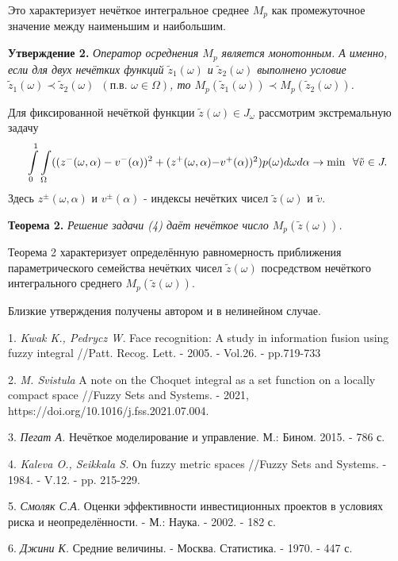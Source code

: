 Это характеризует нечёткое интегральное среднее $M_p$ как промежуточное значение между наименьшим и наибольшим.

\textbf{Утверждение  2.} \textit{Оператор осреднения $M_p$ является монотонным. А именно, если для двух нечётких функций $\tilde{z}_1(\omega)$ и  $\tilde{z}_2(\omega)$ выполнено условие  $\tilde{z}_1(\omega)\prec\tilde{z}_2(\omega)$\,\,\,$(\text{п.в.}\,\,\omega\in\Omega)$, то $M_p(\tilde{z}_1(\omega))\prec M_p(\tilde{z}_2(\omega))$.
}


Для фиксированной нечёткой функции $\tilde{z}(\omega)\in J_{\omega}$ рассмотрим экстремальную задачу
\begin{equation}
\int\limits_{0}^1\int\limits_{\Omega}((z^{-}(\omega, \alpha) - v^{-}(\alpha))^2 + (z^{+}(\omega, \alpha) $$$$- v^{+}(\alpha))^2)p(\omega)d\omega d\alpha\rightarrow\min\,\,\,\forall \tilde{v}\in J.
\end{equation}
Здесь $z^{\pm}(\omega, \alpha)$ и  $v^{\pm}(\alpha)$  - индексы нечётких  чисел $\tilde{z}(\omega)$ и  $\tilde{v}$.

\textbf{Теорема 2.} \textit{Решение задачи (4) даёт нечёткое число  $M_p(\tilde{z}(\omega))$. }


Теорема 2  характеризует определённую равномерность приближения параметрического семейства нечётких чисел $\tilde{z}(\omega)$ посредством нечёткого интегрального среднего $M_p(\tilde{z}(\omega))$.

Близкие  утверждения получены автором и в нелинейном случае.



\litlist

1. {\it Kwak K., Pedrycz W.}
Face recognition: A study in information fusion using fuzzy integral //Patt. Recog. Lett. - 2005. - Vol.26. - pp.719-733

2. {\it M. Svistula}
A note on the Choquet integral as a set function on a locally compact space //Fuzzy Sets and Systems. - 2021, https://doi.org/10.1016/j.fss.2021.07.004.

3. {\it Пегат А.}
Нечёткое моделирование и управление.  М.: Бином. 2015. - 786 с.

4. {\it Kaleva O., Seikkala S.}
On fuzzy metric spaces //Fuzzy Sets and Systems. - 1984. - V.12. - pp. 215-229.

5. {\it Смоляк С.А.}
Оценки эффективности инвестиционных проектов в условиях риска и неопределённости. - М.: Наука. - 2002. - 182 с.

6. {\it Джини К. }
Средние величины. - Москва. Статистика. -  1970. - 447 с.
